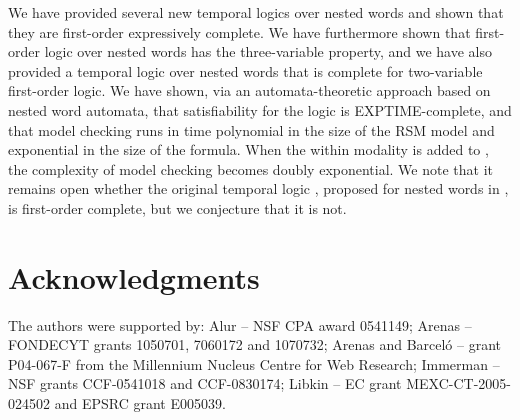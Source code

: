 \documentclass{LMCS}
\theoremstyle{plain}
\theoremstyle{definition}
\newcommand{\caret}{\text{CaRet}}
\begin{document}
\noindent We have provided several new temporal logics over nested words
and shown that they are first-order expressively complete. 
We have furthermore shown that first-order logic over nested
words has the three-variable property, and we have also
provided a temporal logic over nested words that is complete
for two-variable first-order logic.
We have
shown, via an automata-theoretic approach based on 
nested word automata, 
that satisfiability for 
the logic  is
EXPTIME-complete,
and that model checking runs in time polynomial in the size of the
RSM model and exponential in the size of the formula.
When the within modality is added to , the complexity 
of model checking 
becomes doubly exponential.
We note that it remains open whether the original temporal logic \caret,
proposed for nested words 
in \cite{AEM04}, is first-order complete, but we conjecture that it is
not. 


\section*{Acknowledgments}
\noindent The authors were supported by: Alur -- NSF CPA award 0541149; Arenas
-- \mbox{FONDECYT} grants 1050701, 7060172 and 1070732; Arenas and Barcel\'o
-- grant P04-067-F from the Millennium Nucleus Centre for Web
Research; Immerman -- NSF grants CCF-0541018 and CCF-0830174; Libkin
-- EC grant MEXC-CT-2005-024502 and EPSRC grant E005039.
\end{document}
